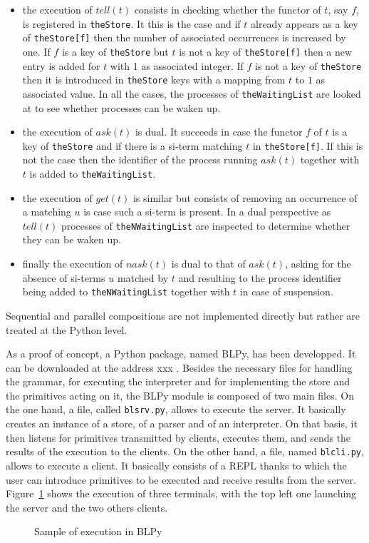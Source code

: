 \begin{itemize}

\item the execution of $tell(t)$ consists in checking whether the
  functor of $t$, say $f$, is registered in \texttt{theStore}. It this
  is the case and if $t$ already appears as a key of
  \texttt{theStore[f]} then the number of associated occurrences is
  increased by one. If $f$ is a key of \texttt{theStore} but $t$ is
  not a key of \texttt{theStore[f]} then a new entry is added for $t$
  with 1 as associated integer. If $f$ is not a key of
  \texttt{theStore} then it is introduced in \texttt{theStore} keys
  with a mapping from $t$ to $1$ as associated value. In all the
  cases, the processes of \texttt{theWaitingList} are looked at to see
  whether processes can be waken up.

\item the execution of $ask(t)$ is dual. It succeeds in case the
  functor $f$ of $t$ is a key of \texttt{theStore} and if there is a
  si-term matching $t$ in \texttt{theStore[f]}. If this is not the
  case then the identifier of the process running $ask(t)$ together
  with $t$ is added to \texttt{theWaitingList}.

\item the execution of $get(t)$ is similar but consists of removing an
  occurrence of a matching $u$ is case such a si-term is present. In a
  dual perspective as $tell(t)$ processes of \texttt{theNWaitingList}
  are inspected to determine whether they can be waken up.

\item finally the execution of $nask(t)$ is dual to that of $ask(t)$,
  asking for the absence of si-terms $u$ matched by $t$ and resulting to
  the process identifier being added to \texttt{theNWaitingList}
  together with $t$ in case of suspension.
  
\end{itemize}

Sequential and parallel compositions are not implemented directly but rather are treated at the Python level.

As a proof of concept, a Python package, named BLPy, has been developped. It can be downloaded at the address xxx . Besides the necessary files for handling the grammar, for executing the interpreter and for implementing the store and the primitives acting on it, the BLPy module is composed of two main files. On the one hand, a file, called \texttt{blsrv.py}, allows to execute the server. It basically creates an instance of a store, of a parser and of an interpreter. On that basis, it then listens for primitives transmitted by clients, executes them, and sends the results of the execution to the clients. On the other hand, a file, named \texttt{blcli.py}, allows to execute a client. It basically consists of a REPL thanks to which the user can introduce primitives to be executed and receive results from the server. Figure~\ref{blpy-test} shows the execution of three terminals, with the top left one launching the server and the two others clients. 

\begin{figure}[t]
\caption{Sample of execution in BLPy
\label{blpy-test}}
\end{figure}











